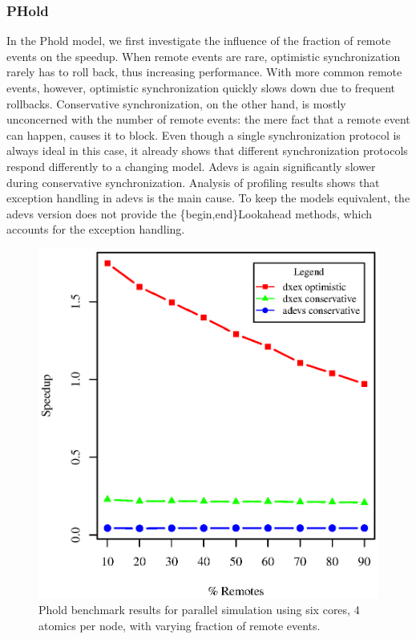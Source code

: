 \subsubsection{PHold}
In the Phold model, we first investigate the influence of the fraction of remote events on the speedup.
When remote events are rare, optimistic synchronization rarely has to roll back, thus increasing performance.
With more common remote events, however, optimistic synchronization quickly slows down due to frequent rollbacks.
Conservative synchronization, on the other hand, is mostly unconcerned with the number of remote events: the mere fact that a remote event can happen, causes it to block.
Even though a single synchronization protocol is always ideal in this case, it already shows that different synchronization protocols respond differently to a changing model.
Adevs is again significantly slower during conservative synchronization.
Analysis of profiling results shows that exception handling in adevs is the main cause. 
To keep the models equivalent, the adevs version does not provide the \{begin,end\}Lookahead methods, which accounts for the exception handling.

\begin{figure}
    \center
    \includegraphics[width=\plotfraction\columnwidth]{fig/phold_speedup_remotes.eps}
    \caption{Phold benchmark results for parallel simulation using six cores, 4 atomics per node, with varying fraction of remote events.}
\end{figure}

